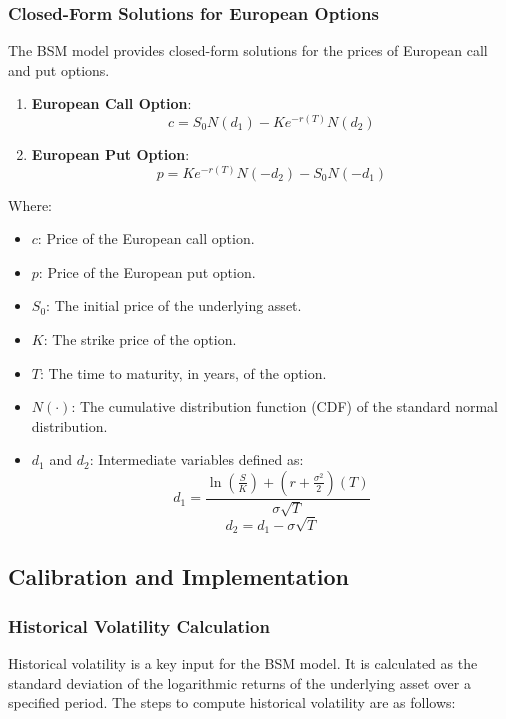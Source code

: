 \documentclass[11pt, oneside, a4paper, titlepage]{report}
\begin{document}
\subsubsection{Closed-Form Solutions for European Options}

The BSM model provides closed-form solutions for the prices of European call and put options.

\begin{enumerate}
    \item \textbf{European Call Option}:
    \[
    c = S_0 N(d_1) - K e^{-r(T)} N(d_2)
    \]
    \item \textbf{European Put Option}:
    \[
    p = K e^{-r(T)} N(-d_2) - S_0 N(-d_1)
    \]
\end{enumerate}

Where:
\begin{itemize}
    \item \( c \): Price of the European call option.
    \item \( p \): Price of the European put option.
    \item \( S_0 \): The initial price of the underlying asset.
    \item \( K \): The strike price of the option.
    \item \( T \): The time to maturity, in years, of the option.
    \item \( N(\cdot) \): The cumulative distribution function (CDF) of the standard normal distribution.
    \item \( d_1 \) and \( d_2 \): Intermediate variables defined as:
    \[
    d_1 = \frac{\ln\left(\frac{S}{K}\right) + \left(r + \frac{\sigma^2}{2}\right)(T)}{\sigma \sqrt{T}}
    \]
    \[
    d_2 = d_1 - \sigma \sqrt{T}
    \]
\end{itemize}

\subsection{Calibration and Implementation}

\subsubsection{Historical Volatility Calculation}

Historical volatility is a key input for the BSM model. It is calculated as the standard deviation of the logarithmic returns of the underlying asset over a specified period. The steps to compute historical volatility are as follows:
\end{document}
